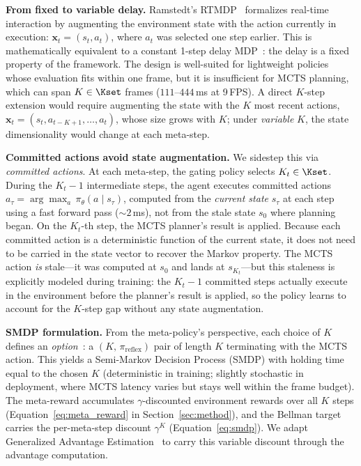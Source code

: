 \textbf{From fixed to variable delay.}
Ramstedt's RTMDP~\citep{ramstedt2019rtrl} formalizes real-time interaction
by augmenting the environment state with the action currently in execution:
$\mathbf{x}_t = (s_t, a_t)$, where $a_t$ was selected one step earlier.
This is mathematically equivalent to a constant 1-step delay
MDP~\citep{walsh2009delayed}: the delay is a fixed property of the framework.
The design is well-suited for lightweight policies whose evaluation fits within
one frame, but it is insufficient for MCTS planning, which can span
$K \in \Kset$ frames ($111$--$444\,$ms at 9\,FPS).
A direct $K$-step extension would require augmenting the state with the $K$
most recent actions, $\mathbf{x}_t = (s_t, a_{t-K+1},\ldots,a_t)$, whose
size grows with $K$; under \emph{variable} $K$, the state dimensionality
would change at each meta-step.

\textbf{Committed actions avoid state augmentation.}
We sidestep this via \emph{committed actions}.
At each meta-step, the gating policy selects $K_t \in \Kset$.
During the $K_t{-}1$ intermediate steps, the agent executes committed actions
$a_\tau = \arg\max_a\,\pi_\theta(a \mid s_\tau)$, computed from the
\emph{current state} $s_\tau$ at each step using a fast forward pass
(${\sim}2\,$ms), not from the stale state $s_0$ where planning began.
On the $K_t$-th step, the MCTS planner's result is applied.
Because each committed action is a deterministic function of the current
state, it does not need to be carried in the state vector to recover the
Markov property.
The MCTS action \emph{is} stale—it was computed at $s_0$ and lands at
$s_{K_t}$—but this staleness is explicitly modeled during training: the
$K_t{-}1$ committed steps actually execute in the environment before the
planner's result is applied, so the policy learns to account for the $K$-step
gap without any state augmentation.

\textbf{SMDP formulation.}
From the meta-policy's perspective, each choice of $K$ defines an
\emph{option}~\citep{sutton1999between}: a $(K,\,\pi_{\mathrm{reflex}})$
pair of length $K$ terminating with the MCTS action.
This yields a Semi-Markov Decision Process (SMDP) with holding time equal to
the chosen $K$ (deterministic in training; slightly stochastic in deployment,
where MCTS latency varies but stays well within the frame budget).
The meta-reward accumulates $\gamma$-discounted environment rewards over all
$K$ steps (Equation~\ref{eq:meta_reward} in Section~\ref{sec:method}), and
the Bellman target carries the per-meta-step discount $\gamma^K$
(Equation~\ref{eq:smdp}).
We adapt Generalized Advantage Estimation~\citep{schulman2015high} to carry
this variable discount through the advantage computation.

